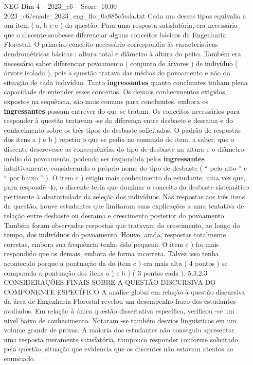 \begin{textsample}{NEG Dim 4 – 2023\_c6 – Score -10.00 – 2023\_c6/enade\_2023\_eng\_flo\_0a885c5cda.txt}
Cada um desses tipos equivalia a um item ( a, b e c ) da questão.
Para uma resposta satisfatória, era necessário que o discente soubesse diferenciar alguns conceitos básicos da Engenharia Florestal.
O primeiro conceito necessário correspondia às características dendrométricas básicas : altura total e diâmetro à altura do peito.
Também era necessário saber diferenciar povoamento ( conjunto de árvores ) de indivíduo ( árvore isolada ), pois a questão tratava das médias do povoamento e não da situação de cada indivíduo.
Tanto \textbf{ingressantes} quanto concluintes tinham plena capacidade de entender esses conceitos.
Os demais conhecimentos exigidos, expostos na sequência, são mais comuns para concluintes, embora os \textbf{ingressantes} possam entrever do que se tratam.
Os conceitos necessários para responder à questão tratavam -se da diferença entre desbaste e desrama e do conhecimento sobre os três tipos de desbaste solicitados.
O padrão de respostas dos itens a ) e b ) repetiu o que se pedia no comando do item, a saber, que o discente descrevesse as consequências do tipo de desbaste na altura e o diâmetro médio do povoamento, podendo ser respondida pelos \textbf{ingressantes} intuitivamente, considerando o próprio nome do tipo de desbaste ( “ pelo alto ” e “ por baixo ” ).
O item c ) exigiu mais conhecimento do estudante, uma vez que, para respondê -lo, o discente teria que dominar o conceito do desbaste sistemático pertinente à aleatoriedade da seleção dos indivíduos.
Nas respostas aos três itens da questão, houve estudantes que limitaram suas explicações a uma tentativa de relação entre desbaste ou desrama e crescimento posterior do povoamento.
Também foram observadas respostas que tratavam do crescimento, ao longo do tempo, dos indivíduos do povoamento.
Houve, ainda, respostas totalmente corretas, embora sua frequência tenha sido pequena.
O item c ) foi mais respondido que os demais, embora de forma incorreta.
Talvez isso tenha acontecido porque a pontuação da do item c ) era mais alta ( 4 pontos ) se comparada a pontuação dos itens a ) e b ) ( 3 pontos cada ). 5.3.2.3 CONSIDERAÇÕES FINAIS SOBRE A QUESTÃO DISCURSIVA DO COMPONENTE ESPECÍFICO A análise global em relação à questão discursiva da área de Engenharia Florestal revelou um desempenho fraco dos estudantes avaliados.
Em relação à única questão dissertativa específica, verificou -se um nível baixo de conhecimento.
Notaram -se também desvios linguísticos em um volume grande de provas.
A maioria dos estudantes não conseguiu apresentar uma resposta meramente satisfatória, tampouco responder conforme solicitado pela questão, situação que evidencia que os discentes não estavam atentos ao enunciado.

\end{textsample}
